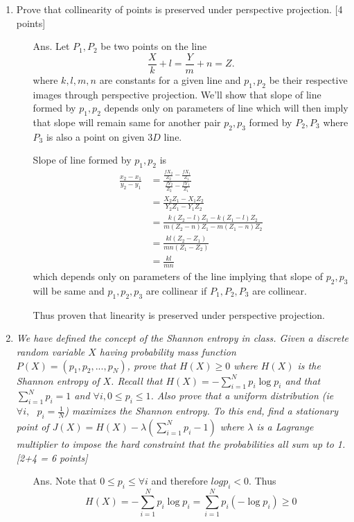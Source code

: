 \documentclass[11pt]{article}
\begin{document}
\begin{enumerate}
\item Prove that collinearity of points is preserved under perspective projection. \textsf{[4 points]} 

\begin{itemize}
\item[Ans.] Let $P_1,P_2$ be two points on the line \[
\frac{X}{k}+l = \frac{Y}{m}+n = Z.
\]
where $k,l,m,n$ are constants for a given line and $p_1,p_2$ be their respective images through perspective projection.
 We'll show that slope of line formed by $p_1,p_2$ depends only on parameters of line which will then imply that slope will remain same for another pair $p_2,p_3$ formed by $P_2,P_3$ where $P_3$ is also a point on given $3D$ line. 


Slope of line formed by $p_1,p_2$ is 
\begin{align}
\frac{x_2-x_1}{y_2-y_1} &= \frac{\frac{f X_2}{Z_2}-\frac{f X_1}{Z_1}}{\frac{f Y_2}{Z_2}-\frac{f Y_1}{Z_1}} \\ 
 &= \frac{X_2 Z_1 - X_1 Z_2}{Y_2 Z_1 - Y_1 Z_2} \\ 
 &= \frac{k(Z_2-l)Z_1 - k(Z_1-l)Z_2}{m(Z_2-n)Z_1 - m(Z_1-n)Z_2}\\
 &= \frac{kl(Z_2-Z_1)}{mn(Z_1-Z_2)}\\
 &= \frac{kl}{mn}
\end{align}
which depends only on parameters of the line implying that slope of $p_2,p_3$ will be same and $p_1,p_2,p_3$ are collinear if $P_1,P_2,P_3$ are collinear.

Thus proven that linearity is preserved under perspective projection.
\end{itemize}

\item \textit{We have defined the concept of the Shannon entropy in class. Given a discrete random variable $X$ having probability mass function $P(X) = (p_1, p_2, ..., p_N)$, prove that $H(X) \geq 0$ where $H(X)$ is the Shannon entropy of $X$. Recall that $H(X) = -\sum\limits_{i=1}^N p_i \log p_i$ and that $\sum\limits_{i=1}^N p_i = 1$ and $\forall i, 0 \leq p_i \leq 1$. Also prove that a uniform distribution (\textit{ie} $\forall i, \textrm{ } p_i = \frac{1}{N}$) maximizes the Shannon entropy. To this end, find a stationary point of $J(X) = H(X) - \lambda (\sum\limits_{i=1}^N p_i - 1)$ where $\lambda$ is a Lagrange multiplier to impose the hard constraint that the probabilities all sum up to 1.  \textsf{[2+4 = 6 points]}}

\begin{itemize}
\item[Ans.] Note that $0 \leq p_i \leq  \forall i$ and therefore $log p_i<0$. Thus  \[
H(X) = -\sum\limits_{i=1}^N p_i \log p_i
 = \sum\limits_{i=1}^N p_i (-\log p_i)
 \geq 0
\]


\end{itemize}
\end{enumerate}
\end{document}
